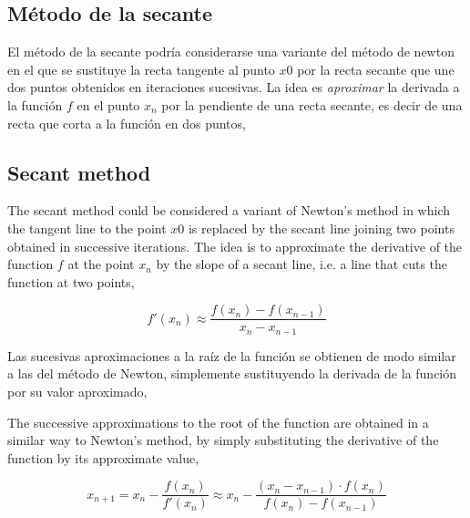 \begin{paracol}{2}

\subsection{Método de la secante}
El método de la secante podría considerarse una variante del método de newton en el que se sustituye la recta tangente al punto $x0$ por la recta secante que une dos puntos obtenidos en iteraciones sucesivas. La idea es \emph{aproximar} la derivada a la función $f$ en el punto $x_n$ por la pendiente de una recta secante, es decir de una recta que corta a la función en dos puntos, 

\switchcolumn

\subsection{Secant method}
The secant method could be considered a variant of Newton's method in which the tangent line to the point $x0$ is replaced by the secant line joining two points obtained in successive iterations. The idea is to approximate the derivative of the function $f$ at the point $x_n$ by the slope of a secant line, i.e. a line that cuts the function at two points, 
\end{paracol}


\begin{equation*}
f'(x_n)\approx \frac{f(x_n)-f(x_{n-1})}{x_n-x_{n-1}}
\end{equation*}

\begin{paracol}{2}
Las sucesivas aproximaciones a la raíz de la función se obtienen de modo similar a las del método de Newton, simplemente sustituyendo la derivada de la función por su valor aproximado,

\switchcolumn
The successive approximations to the root of the function are obtained in a similar way to Newton's method, by simply substituting the derivative of the function by its approximate value,
\end{paracol}

\begin{equation*}
x_{n+1}=x_n-\frac{f(x_n)}{f'(x_n)}\approx x_n-\frac{(x_n-x_{n-1})\cdot f(x_n)}{f(x_n)-f(x_{n-1})}
\end{equation*}

